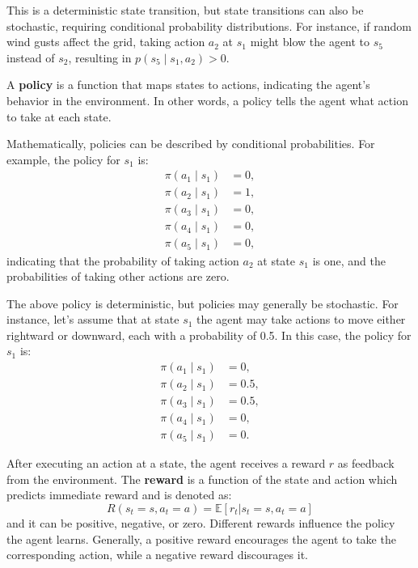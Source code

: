 This is a deterministic state transition,
but state transitions can also be stochastic,
requiring conditional probability distributions.
For instance, if random wind gusts affect the grid,
taking action \( a_2 \) at \( s_1 \) might blow the agent to \( s_5 \)
instead of \( s_2 \), resulting in \( p(s_5 \mid s_1, a_2) > 0 \).

A \textbf{policy} is a function that maps states to actions,
indicating the agent's behavior in the environment.
In other words, a policy tells the agent what action to take
at each state.

Mathematically, policies can be described by conditional probabilities.
For example, the policy for \( s_1 \) is:
\[
\begin{aligned}
\pi(a_1 \mid s_1) &= 0, \\
\pi(a_2 \mid s_1) &= 1, \\
\pi(a_3 \mid s_1) &= 0, \\
\pi(a_4 \mid s_1) &= 0, \\
\pi(a_5 \mid s_1) &= 0,
\end{aligned}
\]
indicating that the probability of taking action \( a_2 \) at state \( s_1 \)
is one, and the probabilities of taking other actions are zero.

The above policy is deterministic, but policies may generally be stochastic.
For instance, let's assume that at state \( s_1 \)
the agent may take actions to move either rightward or downward,
each with a probability of 0.5. In this case, the policy for \( s_1 \) is:
\[
\begin{aligned}
\pi(a_1 \mid s_1) &= 0, \\
\pi(a_2 \mid s_1) &= 0.5, \\
\pi(a_3 \mid s_1) &= 0.5, \\
\pi(a_4 \mid s_1) &= 0, \\
\pi(a_5 \mid s_1) &= 0.
\end{aligned}
\]

After executing an action at a state, the agent receives a
reward \( r \) as feedback from the environment.
The \textbf{reward} is a function of the state and action
which predicts immediate reward and is denoted as:
\begin{equation}
R(s_t=s, a_t=a) = \mathbb{E} [r_t | s_t = s, a_t = a]
\end{equation}
and it can be positive, negative, or zero.
Different rewards influence the policy the agent learns.
Generally, a positive reward encourages the agent to take the
corresponding action, while a negative reward discourages it.

